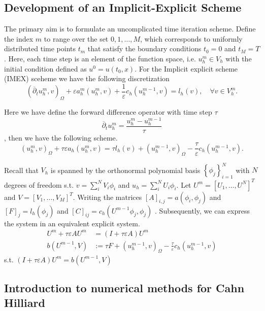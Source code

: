 \subsection{Development of an Implicit-Explicit Scheme}
\label{sub:implicit_explicit_scheme}

The primary aim is to formulate an uncomplicated time iteration scheme. Define the index $m$ to range over the set ${0, 1, \ldots, M}$, which corresponds to uniformly distributed time points $t_{m}$ that satisfy the boundary conditions $t_{0} = 0$
and $t_{M} = T$. Here, each time step is an element of the function space, i.e. $u^{m}_{h} \in V_{h}$  with the initial condition defined as $u^{0} = u( t_{0},x )$.
For the Implicit explicit scheme (IMEX) sceheme we have the following discretization
\[
( \overline{\partial } _{t} u^{m}_{h}, v   )_{\Omega } + \varepsilon a^{m}_{h}( u_{h}^{m} , v) + \frac{1}{\varepsilon } c_{h} (  u_{h}^{m-1}, v)  = l_{h}( v) , \quad \forall v \in V_{h}^{m}.
\]

Here we have define the forward difference operator with time step $\tau $
\[
\overline{\partial } _{t} u_{h}^{m} = \frac{u_{h}^{m} - u_{h}^{m-1}}{ \tau }
\]
, then we have the following scheme.
\[
( u_{h}^{m},v )_{\Omega }  + \tau \varepsilon a_{h}( u_{h}^{m} , v)   = \tau  l_{h}( v) +   ( u_{h}^{m-1},v )_{\Omega } - \frac{\tau}{\varepsilon } c_{h} (  u_{h}^{m-1}, v) .
\]

Recall that $V_{h}$ is spanned by the orthonormal polynomial basis $ \left\{ \phi _{j} \right\}_{i=1}^{ N}  $ with $N$ degrees of freedom  s.t.  $v = \sum_{i}^{N} V_{i} \phi_{i}   $ and $u_{h} = \sum_{i}^{N} U_{i} \phi_{i}   $.
Let  $U^{m} = \left[ U_{1}, \ldots, U^{N} \right]^{T} $ and $V= \left[ V_{1}, \ldots, V_{M} \right]^{T} $. Writing the matrices $[ A ]_{i,j} =  a( \phi _{i}, \phi _{j})  $ and $\left[ F \right] _{j} = l_{h}( \phi _{j})  $ and $ \left[ C \right]_{ij}
= c_{h}( U^{m-1} \phi _{j}, \phi _{j}) $  .
Subsequently, we can express the system in an equivalent explicit system.
\[
    \begin{split}
U^{m}  + \tau \varepsilon A U^{m} & = ( I  + \tau \varepsilon A ) U^{m}   \\
 b(U^{m-1}, V) &:=   \tau  F +   ( u_{h}^{m-1},v )_{\Omega } - \frac{\tau}{\varepsilon } c_{h} (  u_{h}^{m-1}, v)
    \end{split}
\]
s.t. $  ( I  + \tau \varepsilon A ) U^{m} = b(U^{m-1}, V )  $




\subsection{Introduction to numerical methods for Cahn Hilliard}%
\label{sub:introduction_to_numerical_methods_for_cahn_hilliard}

